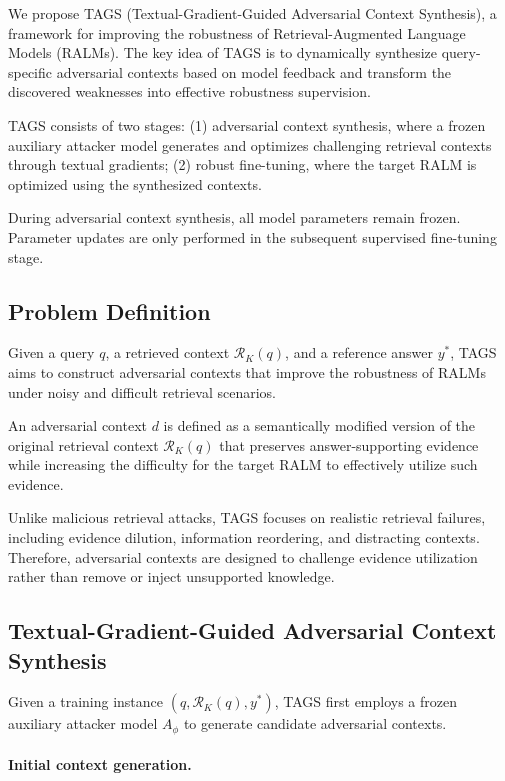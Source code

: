 \documentclass[11pt]{article}
\begin{document}
We propose TAGS (Textual-Gradient-Guided Adversarial Context Synthesis), a framework for improving the robustness of Retrieval-Augmented Language Models (RALMs). 
The key idea of TAGS is to dynamically synthesize query-specific adversarial contexts based on model feedback and transform the discovered weaknesses into effective robustness supervision.

TAGS consists of two stages:
(1) adversarial context synthesis, where a frozen auxiliary attacker model generates and optimizes challenging retrieval contexts through textual gradients;
(2) robust fine-tuning, where the target RALM is optimized using the synthesized contexts.

During adversarial context synthesis, all model parameters remain frozen. 
Parameter updates are only performed in the subsequent supervised fine-tuning stage.


\subsection{Problem Definition}

Given a query $q$, a retrieved context $\mathcal{R}_{K}(q)$, and a reference answer $y^*$, TAGS aims to construct adversarial contexts that improve the robustness of RALMs under noisy and difficult retrieval scenarios.

An adversarial context $d$ is defined as a semantically modified version of the original retrieval context $\mathcal{R}_{K}(q)$ that preserves answer-supporting evidence while increasing the difficulty for the target RALM to effectively utilize such evidence.

Unlike malicious retrieval attacks, TAGS focuses on realistic retrieval failures, including evidence dilution, information reordering, and distracting contexts. 
Therefore, adversarial contexts are designed to challenge evidence utilization rather than remove or inject unsupported knowledge.


\subsection{Textual-Gradient-Guided Adversarial Context Synthesis}

Given a training instance $(q,\mathcal{R}_{K}(q),y^*)$, TAGS first employs a frozen auxiliary attacker model $A_{\phi}$ to generate candidate adversarial contexts.

\paragraph{Initial context generation.}
\end{document}
